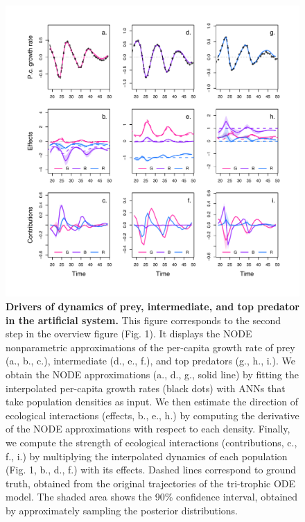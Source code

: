 \documentclass[11pt, oneside]{article}
\begin{document}
\newpage
\begin{figure}[H]
\begin{center}
\includegraphics[width=\linewidth]{figure_3.png}
\caption{
    \textbf{Drivers of dynamics of prey, intermediate, and top predator in the artificial system.}
    This figure corresponds to the second step in the overview figure (Fig. 1).
    It displays the NODE nonparametric approximations of the per-capita growth rate of prey (a., b., c.), intermediate (d., e., f.), and top predators (g., h., i.).
    We obtain the NODE approximations (a., d., g., solid line) by fitting the interpolated per-capita growth rates (black dots) with ANNs that take population densities as input.
    We then estimate the direction of ecological interactions (effects, b., e., h.) by computing the derivative of the NODE approximations with respect to each density.
    Finally, we compute the strength of ecological interactions (contributions, c., f., i.) by multiplying the interpolated dynamics of each population (Fig. 1, b., d., f.) with its effects.
    Dashed lines correspond to ground truth, obtained from the original trajectories of the tri-trophic ODE model. 
    The shaded area shows the 90\% confidence interval, obtained by approximately sampling the posterior distributions. 
}
\end{center}
\end{figure}
\newpage
\end{document}
